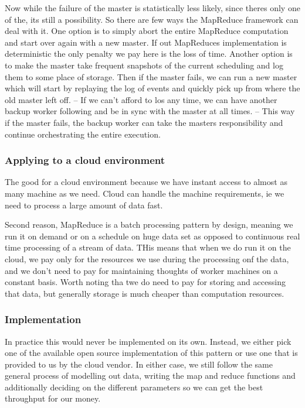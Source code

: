 Now while the failure of the master is statistically less likely, since theres only one of the, its still a possibility.
So there are few ways the MapReduce framework can deal with it.
One option is to simply abort the entire MapReduce computation and start over again with a new master.
If out MapReduces implementation is deterministic the only penalty we pay here is the loss of time.
Another option is to make the master take frequent snapshots of the current scheduling and log them to some place of storage.
Then if the master fails, we can run a new master which will start by replaying the log of events and quickly pick up from where the old master left off.
-- If we can't afford to los any time, we can have another backup worker following and be in sync with the master at all times.
-- This way if the master fails, the backup worker can take the masters responsibility and continue orchestrating the entire execution.

\subsubsection{Applying to a cloud environment}
The good for a cloud environment because we have instant access to almost as many machine as we need.
Cloud can handle the machine requirements, ie we need to process a large amount of data fast.

Second reason, MapReduce is a batch processing pattern by design, meaning we run it on demand or on a schedule on huge data set as opposed to continuous real time processing of a stream of data.
THis means that when we do run it on the cloud, we pay only for the resources we use during the processing onf the data, and we don't need to pay for maintaining thoughts of worker machines on a constant basis.
Worth noting tha twe do need to pay for storing and accessing that data, but generally storage is much cheaper than computation resources.

\subsubsection{Implementation}
In practice this would never be implemented on its own.
Instead, we either pick one of the available open source implementation of this pattern or use one that is provided to us by the cloud vendor.
In either case, we still follow the same general process of modelling out data, writing the map and reduce functions and additionally deciding on the different parameters so we can get the best throughput for our money.

